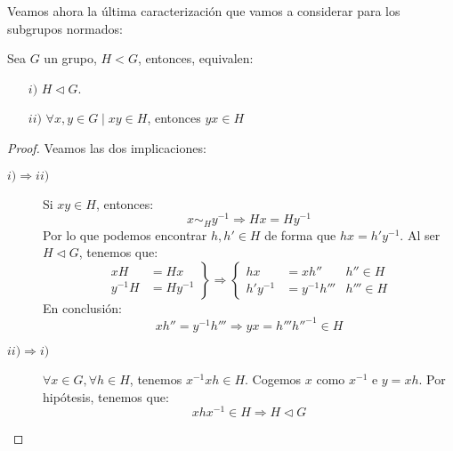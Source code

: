 Veamos ahora la última caracterización que vamos a considerar para los subgrupos normados:

\begin{prop}
    Sea $G$ un grupo, $H<G$, entonces, equivalen:
    \begin{enumerate}
        \item[$i)$] $H\lhd G$.
        \item[$ii)$] $\forall x,y\in G \mid xy \in H$, entonces $yx \in H$
    \end{enumerate}
    \begin{proof}
        Veamos las dos implicaciones:
        \begin{description}
            \item [$i)\Longrightarrow ii)$] Si $xy \in H$, entonces:
                \begin{equation*}
                    x\sim_H y^{-1} \Longrightarrow Hx = Hy^{-1}
                \end{equation*}
                Por lo que podemos encontrar $h,h'\in H$ de forma que $hx = h'y^{-1}$. Al ser $H\lhd G$, tenemos que:
                \begin{equation*}
                    \left.\begin{array}{rl}
                            xH &= Hx \\
                            y^{-1}H &= Hy^{-1}
                        \end{array}\right\} \Longrightarrow \left\{\begin{array}{rll}
                        hx &= xh'' & h'' \in H \\
                        h'y^{-1} &= y^{-1} h ''' &h''' \in H
                    \end{array}\right.
                \end{equation*}
                En conclusión:
                \begin{equation*}
                    xh'' = y^{-1}h'''\Longrightarrow yx = h''' h''^{-1} \in H
                \end{equation*}
            \item [$ii)\Longrightarrow i)$] $\forall x\in G, \forall h\in H$, tenemos $x^{-1}xh \in H$. Cogemos $x$ como $x^{-1}$ e $y = xh$. Por hipótesis, tenemos que:
                \begin{equation*}
                    xhx^{-1} \in H \Longrightarrow H\lhd G
                \end{equation*}
        \end{description}
    \end{proof}
\end{prop}

